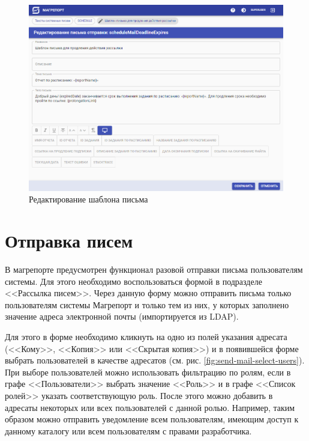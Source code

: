 \documentclass[../user-manual.tex]{subfiles}
\begin{document}
	\begin{figure}[h]
		\centering
		\includegraphics[width=\graphicswidth]{img/25-letter-template-editor.png}
		\caption{Редактирование шаблона письма}
		\label{fig:letter-template-editor}
	\end{figure}	
	
	\section{Отправка писем}
	
	В магрепорте предусмотрен функционал разовой отправки письма пользователям системы. Для этого необходимо воспользоваться формой в подразделе <<Рассылка писем>>. Через данную форму можно отправить письма только пользователям системы Магрепорт и только тем из них, у которых заполнено значение адреса электронной почты (импортируется из LDAP).
	
	Для этого в форме необходимо кликнуть на одно из полей указания адресата (<<Кому>>, <<Копия>> или <<Скрытая копия>>) и в появившейся форме выбрать пользователей в качестве адресатов (см. рис. \ref{fig:send-mail-select-users}). При выборе пользователей можно использовать фильтрацию по ролям, если в графе <<Пользователи>> выбрать значение <<Роль>> и в графе <<Список ролей>> указать соответствующую роль. После этого можно добавить в адресаты некоторых или всех пользователей с данной ролью. Например, таким образом можно отправить уведомление всем пользователям, имеющим доступ к данному каталогу или всем пользователям с правами разработчика.
	
\end{document}
